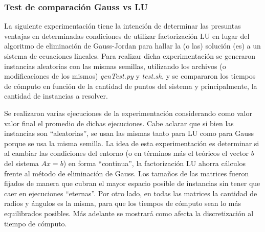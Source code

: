 \subsubsection{Test de comparación Gauss vs LU}
La siguiente experimentación tiene la intención de determinar las presuntas ventajas en determinadas condiciones de utilizar factorización LU en lugar del algoritmo de eliminación de Gauss-Jordan para hallar la (o las) solución (es) a un sistema de ecuaciones lineales. Para realizar dicha experimentación se generaron instancias aleatorias con las mismas semillas, utilizando los archivos (o modificaciones de los mismos) \emph{genTest.py} y \emph{test.sh}, y se compararon los tiempos de cómputo en función de la cantidad de puntos del sistema y principalmente, la cantidad de instancias a resolver. 

Se realizaron varias ejecuciones de la experimentación considerando como valor valor final el promedio de dichas ejecuciones. Cabe aclarar que si bien las instancias son ``aleatorias'', se usan las mismas tanto para LU como para Gauss porque se usa la misma semilla. La idea de esta experimentación es determinar si al cambiar las condiciones del entorno (o en términos más el teóricos el vector $b$ del sistema $Ax=b$) en forma ``continua'', la factorización LU ahorra cálculos frente al método de eliminación de Gauss. Los tamaños de las matrices fueron fijados de manera que cubran el mayor espacio posible de instancias sin tener que caer en ejecuciones ``eternas''. Por otro lado, en todas las matrices la cantidad de radios y ángulos es la misma, para que los tiempos de cómputo sean lo más equilibrados posibles. Más adelante se mostrará como afecta la discretización al tiempo de cómputo.
